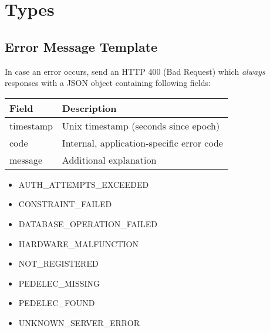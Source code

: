 \section{Types}

%

\subsection{Error Message Template}
\label{types:error-msg-template}

In case an error occurs, send an HTTP 400 (Bad Request) which \textit{always} responses with a JSON object containing following fields: 

\begin{tabularx}{\linewidth}{ | l | X | }
  \hline
  \rowcolor{table-head}
  Field & Description \\
  \hline
  timestamp & Unix timestamp (seconds since epoch)  \\
  code 		& Internal, application-specific error code \\
  message 	& Additional explanation \\
  \hline
\end{tabularx}


\begin{itemize}
    \item AUTH\_ATTEMPTS\_EXCEEDED
    \item CONSTRAINT\_FAILED
    \item DATABASE\_OPERATION\_FAILED
    \item HARDWARE\_MALFUNCTION
    \item NOT\_REGISTERED
    \item PEDELEC\_MISSING
    \item PEDELEC\_FOUND
    \item UNKNOWN\_SERVER\_ERROR
\end{itemize}

